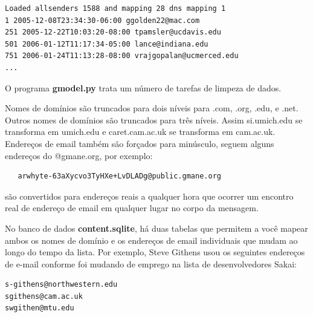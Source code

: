 \beforeverb
\begin{verbatim}
Loaded allsenders 1588 and mapping 28 dns mapping 1
1 2005-12-08T23:34:30-06:00 ggolden22@mac.com
251 2005-12-22T10:03:20-08:00 tpamsler@ucdavis.edu
501 2006-01-12T11:17:34-05:00 lance@indiana.edu
751 2006-01-24T11:13:28-08:00 vrajgopalan@ucmerced.edu
...
\end{verbatim}
\afterverb
%

O programa {\bf gmodel.py} trata um número de tarefas de limpeza de dados.

Nomes de domínios são truncados para dois níveis para .com, .org, .edu, e .net. 
Outros nomes de domínios são truncados para três níveis. Assim si.umich.edu
se transforma em umich.edu e caret.cam.ac.uk se transforma em cam.ac.uk.
Endereços de email também são forçados para minúsculo, seguem alguns endereços
do @gmane.org, por exemplo:

\beforeverb
\begin{verbatim}
   arwhyte-63aXycvo3TyHXe+LvDLADg@public.gmane.org
\end{verbatim}
\afterverb
%

são convertidos para endereços reais a qualquer hora que ocorrer um encontro
real de endereço de email em qualquer lugar no corpo da mensagem. 

No banco de dados {\bf content.sqlite}, há duas tabelas que permitem a você
mapear ambos os nomes de domínio e os endereços de email individuais que mudam
ao longo do tempo da lista. Por exemplo, Steve Githens usou os seguintes endereços 
de e-mail conforme foi mudando de emprego na lista de desenvolvedores Sakai:

\beforeverb
\begin{verbatim}
s-githens@northwestern.edu
sgithens@cam.ac.uk
swgithen@mtu.edu
\end{verbatim}
\afterverb
%

